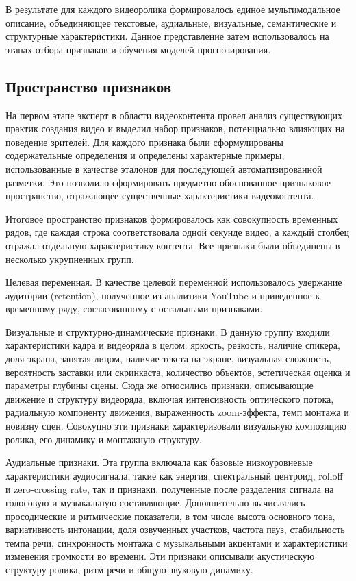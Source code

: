 \documentclass[times]{itmo-student-thesis}
\begin{document}
В результате для каждого видеоролика формировалось единое мультимодальное описание, объединяющее текстовые, аудиальные, визуальные, семантические и структурные характеристики. Данное представление затем использовалось на этапах отбора признаков и обучения моделей прогнозирования.

\subsection{Пространство признаков}

На первом этапе эксперт в области видеоконтента провел анализ существующих практик создания видео и выделил набор признаков, потенциально влияющих на поведение зрителей. Для каждого признака были сформулированы содержательные определения и определены характерные примеры, использованные в качестве эталонов для последующей автоматизированной разметки. Это позволило сформировать предметно обоснованное признаковое пространство, отражающее существенные характеристики видеоконтента.

Итоговое пространство признаков формировалось как совокупность временных рядов, где каждая строка соответствовала одной секунде видео, а каждый столбец отражал отдельную характеристику контента. Все признаки были объединены в несколько укрупненных групп.

Целевая переменная. В качестве целевой переменной использовалось удержание аудитории (retention), полученное из аналитики YouTube и приведенное к временному ряду, согласованному с остальными признаками.

Визуальные и структурно-динамические признаки. В данную группу входили характеристики кадра и видеоряда в целом: яркость, резкость, наличие спикера, доля экрана, занятая лицом, наличие текста на экране, визуальная сложность, вероятность заставки или скринкаста, количество объектов, эстетическая оценка и параметры глубины сцены. Сюда же относились признаки, описывающие движение и структуру видеоряда, включая интенсивность оптического потока, радиальную компоненту движения, выраженность zoom-эффекта, темп монтажа и новизну сцен. Совокупно эти признаки характеризовали визуальную композицию ролика, его динамику и монтажную структуру.

Аудиальные признаки. Эта группа включала как базовые низкоуровневые характеристики аудиосигнала, такие как энергия, спектральный центроид, rolloff и zero-crossing rate, так и признаки, полученные после разделения сигнала на голосовую и музыкальную составляющие. Дополнительно вычислялись просодические и ритмические показатели, в том числе высота основного тона, вариативность интонации, доля озвученных участков, частота пауз, стабильность темпа речи, синхронность монтажа с музыкальными акцентами и характеристики изменения громкости во времени. Эти признаки описывали акустическую структуру ролика, ритм речи и общую звуковую динамику.
\end{document}
